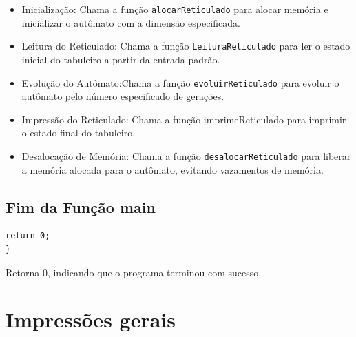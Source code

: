 \documentclass{article}
\begin{document}
\begin{itemize}

\item Inicialização: Chama a função \verb|alocarReticulado| para alocar memória e inicializar o autômato com a dimensão especificada.

\item Leitura do Reticulado: Chama a função \verb|LeituraReticulado| para ler o estado inicial do tabuleiro a partir da entrada padrão.

\item Evolução do Autômato:Chama a função \verb|evoluirReticulado| para evoluir o autômato pelo número especificado de gerações.

\item Impressão do Reticulado: Chama a função imprimeReticulado para imprimir o estado final do tabuleiro.

\item Desalocação de Memória: Chama a função \verb|desalocarReticulado| para liberar a memória alocada para o autômato, evitando vazamentos de memória.

\end{itemize}

\subsection{Fim da Função main}

\begin{lstlisting}[caption={},label={lst:cod1},language={[x86masm]Assembler}]
return 0;
}

 \end{lstlisting}

 \par Retorna 0, indicando que o programa terminou com sucesso.

\section{Impressões gerais}
\end{document}
